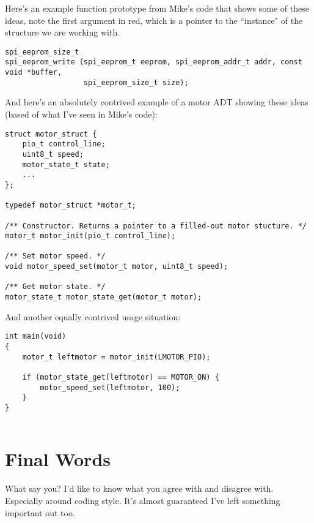 \documentclass[10pt]{article}
\begin{document}
\noindent Here's an example function prototype from Mike's code that shows some of these ideas, note the first argument in red, which is a pointer to the ``instance" of the structure we are working with.

\begin{lstlisting}[frame=single]
spi_eeprom_size_t
spi_eeprom_write (spi_eeprom_t eeprom, spi_eeprom_addr_t addr, const void *buffer, 
				  spi_eeprom_size_t size);
\end{lstlisting}

\noindent And here's an absolutely contrived example of a motor ADT showing these ideas (based of what I've seen in Mike's code):
\begin{lstlisting}[frame=single]
struct motor_struct {
	pio_t control_line;
	uint8_t speed;
	motor_state_t state;
	...
};

typedef motor_struct *motor_t;

/** Constructor. Returns a pointer to a filled-out motor stucture. */
motor_t motor_init(pio_t control_line);

/** Set motor speed. */
void motor_speed_set(motor_t motor, uint8_t speed);

/** Get motor state. */
motor_state_t motor_state_get(motor_t motor);
\end{lstlisting}
\noindent And another equally contrived usage situation:
\begin{lstlisting}[frame=single]
int main(void)
{
	motor_t leftmotor = motor_init(LMOTOR_PIO);
	
	if (motor_state_get(leftmotor) == MOTOR_ON) {
		motor_speed_set(leftmotor, 100);
	}
}
	
\end{lstlisting}

\section{Final Words}
What say you? I'd like to know what you agree with and disagree with. Especially around coding style. It's almost guaranteed I've left something important out too.
\end{document}
